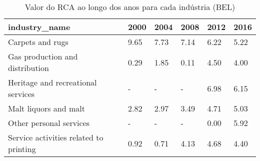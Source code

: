 \begin{table}
\centering
\caption{Valor do RCA ao longo dos anos para cada indústria (BEL)}
\begin{tabular}{p{6cm}p{1.5cm}p{1.5cm}p{1.5cm}p{1.5cm}p{1.5cm}}
\toprule
                         industry\_name & 2000 & 2004 & 2008 & 2012 & 2016 \\
\midrule
                      Carpets and rugs & 9.65 & 7.73 & 7.14 & 6.22 & 5.22 \\
       Gas production and distribution & 0.29 & 1.85 & 0.11 & 4.50 & 4.00 \\
    Heritage and recreational services &    - &    - &    - & 6.98 & 6.15 \\
                 Malt liquors and malt & 2.82 & 2.97 & 3.49 & 4.71 & 5.03 \\
               Other personal services &    - &    - &    - & 0.00 & 5.92 \\
Service activities related to printing & 0.92 & 0.71 & 4.13 & 4.68 & 4.40 \\
\bottomrule
\end{tabular}
\end{table}

